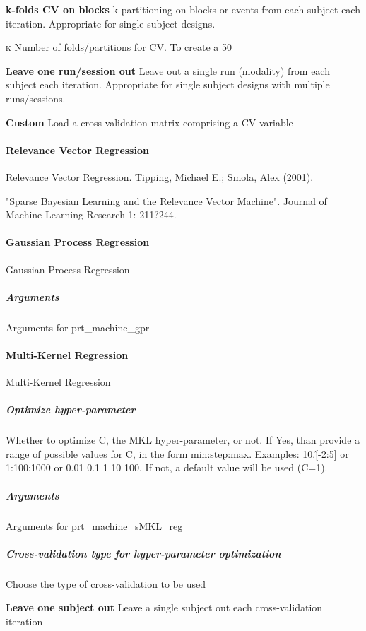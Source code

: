\textbf{k-folds CV on blocks}
k-partitioning on blocks or events from each subject each iteration. Appropriate for single subject designs.


\textsc{k}
Number of folds/partitions for CV. To create a 50%


\textbf{Leave one run/session out}
Leave out a single run (modality) from each subject each iteration. Appropriate for single subject designs with multiple runs/sessions.


\textbf{Custom}
Load a cross-validation matrix comprising a CV variable


\paragraph{Relevance Vector Regression}
Relevance Vector Regression. Tipping, Michael E.; Smola, Alex (2001).

"Sparse Bayesian Learning and the Relevance Vector Machine". Journal of Machine Learning Research 1: 211?244.


\paragraph{Gaussian Process Regression}
Gaussian Process Regression


\subparagraph{Arguments}
Arguments for prt\_machine\_gpr


\paragraph{Multi-Kernel Regression}
Multi-Kernel Regression


\subparagraph{Optimize hyper-parameter}
Whether to optimize C, the MKL hyper-parameter, or not. If Yes, than provide a range of possible values for C, in the form min:step:max. Examples: 10.\^[-2:5] or 1:100:1000 or 0.01 0.1 1 10 100. If not, a default value will be used (C=1).


\subparagraph{Arguments}
Arguments for prt\_machine\_sMKL\_reg


\subparagraph{Cross-validation type for hyper-parameter optimization}
Choose the type of cross-validation to be used


\textbf{Leave one subject out}
Leave a single subject out each cross-validation iteration



